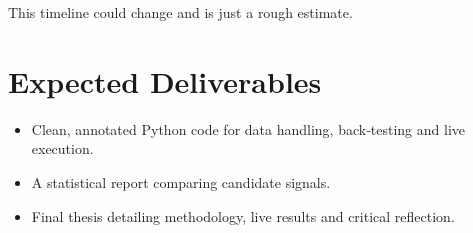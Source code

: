 \documentclass[a4paper,12pt]{article}
\begin{document}
This timeline could change and is just a rough estimate.

\section{Expected Deliverables}

\begin{itemize}
  \item Clean, annotated Python code for data handling, back‑testing and
        live execution.
  \item A statistical report comparing candidate signals.
  \item Final thesis  detailing methodology, live results and
        critical reflection.
\end{itemize}

\end{document}
